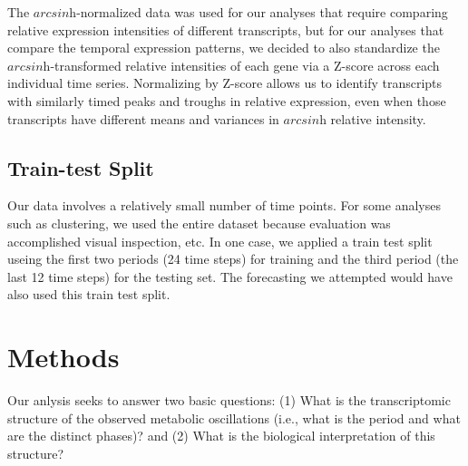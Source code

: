 \documentclass[11pt]{amsart}
\begin{document}
The $\textit{arcsinh}$-normalized data was used for our analyses that require comparing relative expression intensities of different transcripts, but for our analyses that compare the temporal expression patterns, we decided to also standardize the $\textit{arcsinh}$-transformed relative intensities of each gene via a Z-score across each individual time series. Normalizing by Z-score allows us to identify transcripts with similarly timed peaks and troughs in relative expression, even when those transcripts have different means and variances in $\textit{arcsinh}$ relative intensity.

\subsection{Train-test Split}
Our data involves a relatively small number of time points. For some analyses such as clustering, we used the entire dataset because evaluation was accomplished visual inspection, etc. In one case, we applied a train test split useing the first two periods (24 time steps) for training and the third period (the last 12 time steps) for the testing set. The forecasting we attempted would have also used this train test split.

\section{Methods} 



Our anlysis seeks to answer two basic questions: (1) What is the transcriptomic structure of the observed metabolic oscillations (i.e., what is the period and what are the distinct phases)? and (2) What is the biological interpretation of this structure?
\end{document}
